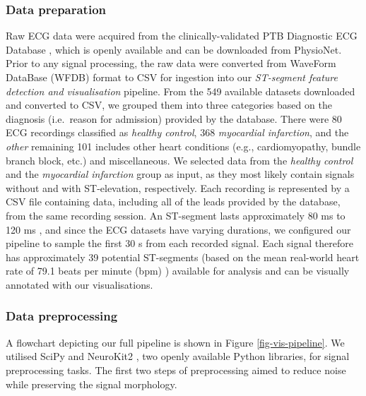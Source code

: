 \documentclass[
  10pt,
  letterpaper,
]{article}
\begin{document}
\subsubsection{Data preparation}\label{data-preparation}

Raw ECG data were acquired from the clinically-validated PTB Diagnostic
ECG Database \cite{ptb}, which is openly available and can be downloaded
from PhysioNet. Prior to any signal processing, the raw data were
converted from WaveForm DataBase (WFDB) format to CSV for ingestion into
our \textit{ST-segment feature detection and visualisation} pipeline.
From the 549 available datasets downloaded and converted to CSV, we
grouped them into three categories based on the diagnosis (i.e.~reason
for admission) provided by the database. There were 80 ECG recordings
classified as \textit{healthy control}, 368
\textit{myocardial infarction}, and the \textit{other} remaining 101
includes other heart conditions (e.g., cardiomyopathy, bundle branch
block, etc.) and miscellaneous. We selected data from the
\textit{healthy control} and the \textit{myocardial infarction} group as
input, as they most likely contain signals without and with
ST-elevation, respectively. Each recording is represented by a CSV file
containing data, including all of the leads provided by the database,
from the same recording session. An ST-segment lasts approximately 80 ms
to 120 ms \cite{sattar2023}, and since the ECG datasets have varying
durations, we configured our pipeline to sample the first 30 s from each
recorded signal. Each signal therefore has approximately 39 potential
ST-segments (based on the mean real-world heart rate of 79.1 beats per
minute (bpm) \cite{Avram2019}) available for analysis and can be
visually annotated with our visualisations.

\subsubsection{Data preprocessing}\label{sec-data-preprocess}

A flowchart depicting our full pipeline is shown in Figure
\ref{fig-vis-pipeline}. We utilised SciPy \cite{2020SciPy-NMeth} and
NeuroKit2 \cite{Makowski2021neurokit}, two openly available Python
libraries, for signal preprocessing tasks. The first two steps of
preprocessing aimed to reduce noise while preserving the signal
morphology.
\end{document}
